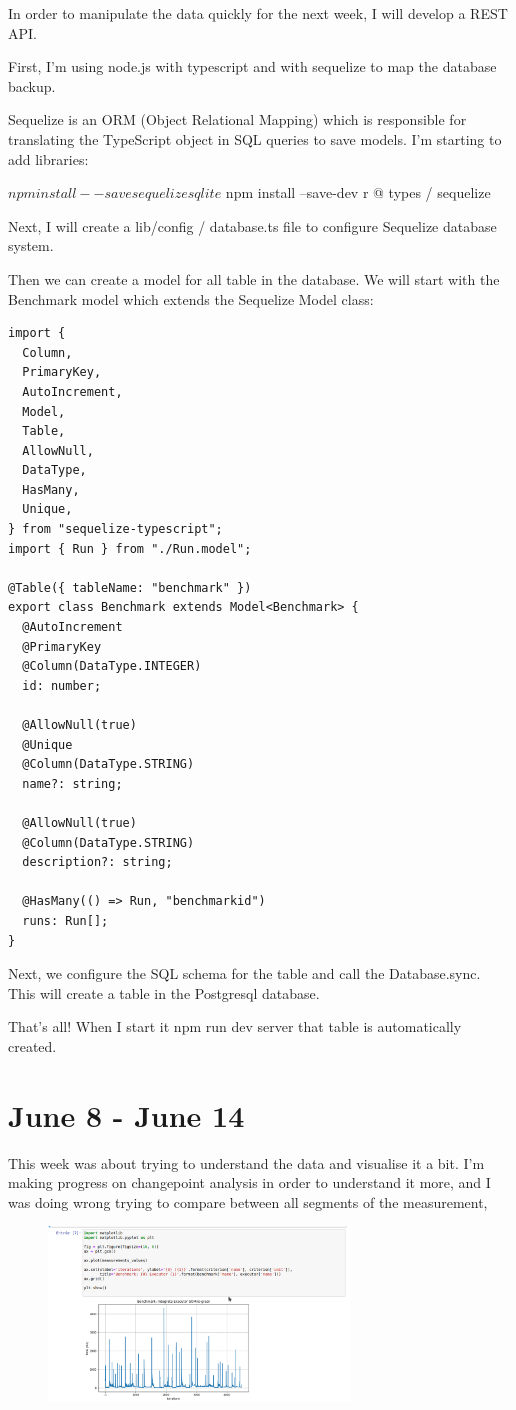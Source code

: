\documentclass[12pt,a4paper]{article}
\begin{document}
In order to manipulate the data quickly for the next week, I will develop a REST API.

First, I'm using node.js with typescript and with sequelize to map the database backup.

Sequelize is an ORM (Object Relational Mapping) which is responsible for translating the TypeScript object in SQL queries to save models.
I'm starting to add libraries:

$ npm install --save sequelize sqlite
$ npm install --save-dev r @ types / sequelize


Next, I will create a lib/config / database.ts file to configure Sequelize database system.

Then we can create a model for all table in the database. We will start with the Benchmark model which extends the Sequelize Model class:

\begin{lstlisting}
import {
  Column,
  PrimaryKey,
  AutoIncrement,
  Model,
  Table,
  AllowNull,
  DataType,
  HasMany,
  Unique,
} from "sequelize-typescript";
import { Run } from "./Run.model";

@Table({ tableName: "benchmark" })
export class Benchmark extends Model<Benchmark> {
  @AutoIncrement
  @PrimaryKey
  @Column(DataType.INTEGER)
  id: number;

  @AllowNull(true)
  @Unique
  @Column(DataType.STRING)
  name?: string;

  @AllowNull(true)
  @Column(DataType.STRING)
  description?: string;

  @HasMany(() => Run, "benchmarkid")
  runs: Run[];
}
\end{lstlisting}


Next, we configure the SQL schema for the table and call the Database.sync. This will create a table in the Postgresql database.

That's all! When I start it npm run dev server that table is automatically created.

\section{June 8 - June 14}

This week was about trying to understand the data and visualise it a bit. I'm making progress on changepoint analysis in order to understand it more, and I was doing wrong trying to compare between all segments of the measurement,

\begin{figure}[h]
\includegraphics[width=8cm]{assets/Screenshot_20200906_111933.png}
\end{figure}
\end{document}
